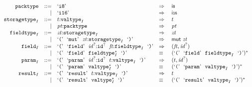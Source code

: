 \vspace{1ex}

$$
\begin{array}[t]{@{}lrrl@{}l@{}l@{}l@{}}
& {\mathtt{packtype}} & ::= & \mbox{‘\texttt{i8}’} & \quad\Rightarrow\quad{} & \mathsf{i{\scriptstyle 8}} \\
& & | & \mbox{‘\texttt{i16}’} & \quad\Rightarrow\quad{} & \mathsf{i{\scriptstyle 16}} \\
& {{\mathtt{storagetype}}}_{I} & ::= & t{:}{{\mathtt{valtype}}}_{I} & \quad\Rightarrow\quad{} & t \\
& & | & {\mathit{pt}}{:}{\mathtt{packtype}} & \quad\Rightarrow\quad{} & {\mathit{pt}} \\
& {{\mathtt{fieldtype}}}_{I} & ::= & {\mathit{zt}}{:}{{\mathtt{storagetype}}}_{I} & \quad\Rightarrow\quad{} & {\mathit{zt}} \\
& & | & \mbox{‘\texttt{{(}}’}~~\mbox{‘\texttt{mut}’}~~{\mathit{zt}}{:}{{\mathtt{storagetype}}}_{I}~~\mbox{‘\texttt{{)}}’} & \quad\Rightarrow\quad{} & \mathsf{mut}~{\mathit{zt}} \\
& {{\mathtt{field}}}_{I} & ::= & \mbox{‘\texttt{{(}}’}~~\mbox{‘\texttt{field}’}~~{{\mathit{id}}^?}{:}{{\mathtt{id}}^?}~~{\mathit{ft}}{:}{{\mathtt{fieldtype}}}_{I}~~\mbox{‘\texttt{{)}}’} & \quad\Rightarrow\quad{} & ({\mathit{ft}}, {{\mathit{id}}^?}) \\
& & | & \mbox{‘\texttt{{(}}’}~~\mbox{‘\texttt{field}’}~~{{{\mathtt{fieldtype}}}_{I}^\ast}~~\mbox{‘\texttt{{)}}’} & \quad\equiv\quad{} & {(\mbox{‘\texttt{{(}}’}~~\mbox{‘\texttt{field}’}~~{{\mathtt{fieldtype}}}_{I}~~\mbox{‘\texttt{{)}}’})^\ast} \\
& {{\mathtt{param}}}_{I} & ::= & \mbox{‘\texttt{{(}}’}~~\mbox{‘\texttt{param}’}~~{{\mathit{id}}^?}{:}{{\mathtt{id}}^?}~~t{:}{{\mathtt{valtype}}}_{I}~~\mbox{‘\texttt{{)}}’} & \quad\Rightarrow\quad{} & (t, {{\mathit{id}}^?}) \\
& & | & \mbox{‘\texttt{{(}}’}~~\mbox{‘\texttt{param}’}~~{{{\mathtt{valtype}}}_{I}^\ast}~~\mbox{‘\texttt{{)}}’} & \quad\equiv\quad{} & {(\mbox{‘\texttt{{(}}’}~~\mbox{‘\texttt{param}’}~~{{\mathtt{valtype}}}_{I}~~\mbox{‘\texttt{{)}}’})^\ast} \\
& {{\mathtt{result}}}_{I} & ::= & \mbox{‘\texttt{{(}}’}~~\mbox{‘\texttt{result}’}~~t{:}{{\mathtt{valtype}}}_{I}~~\mbox{‘\texttt{{)}}’} & \quad\Rightarrow\quad{} & t \\
& & | & \mbox{‘\texttt{{(}}’}~~\mbox{‘\texttt{result}’}~~{{{\mathtt{valtype}}}_{I}^\ast}~~\mbox{‘\texttt{{)}}’} & \quad\equiv\quad{} & {(\mbox{‘\texttt{{(}}’}~~\mbox{‘\texttt{result}’}~~{{\mathtt{valtype}}}_{I}~~\mbox{‘\texttt{{)}}’})^\ast} \\

\end{array}$$
